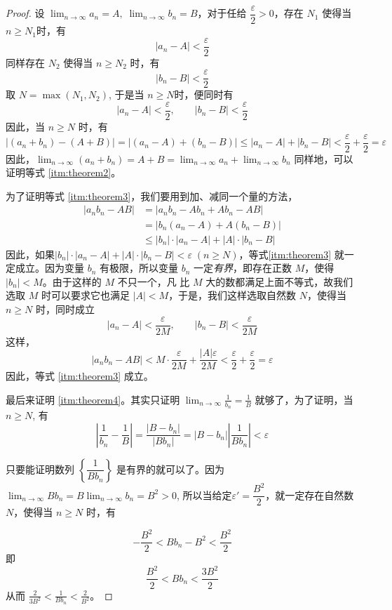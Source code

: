 \begin{proof}
    设 $\displaystyle \lim_{n\to\infty}a_n=A,\; \lim_{n\to\infty}b_n=B$，对于任给 $\dfrac{\varepsilon}{2}>0$，存在 $N_1$ 使得当 $n\geqslant N_1$时，有
\[|a_n-A|<\frac{\varepsilon}{2}\]
    同样存在 $N_2$ 使得当 $n\geqslant N_2$ 时，有
    \[|b_n-B|<\frac{\varepsilon}{2}\]
    取 $N=\max(N_1,N_2)$, 于是当 $n\geqslant N$时，便同时有
\[|a_n-A|<\frac{\varepsilon}{2},\qquad |b_n-B|<\frac{\varepsilon}{2}\]
    因此，当 $n\geqslant N$ 时，有
\[|(a_n+b_n)-(A+B)|=|(a_n-A)+(b_n-B)|\le |a_n-A|+|b_n-B|<\frac{\varepsilon}{2}+\frac{\varepsilon}{2}=\varepsilon\]
因此，$\displaystyle\lim_{n\to\infty}(a_n+b_n)=A+B=\lim_{n\to\infty}a_n+\lim_{n\to\infty}b_n$
同样地，可以证明等式 \ref{itm:theorem2}。

\medskip
为了证明等式 \ref{itm:theorem3}，我们要用到加、减同一个量的方法，
\[\begin{split}
    |a_nb_n - AB| &= |a_nb_n - Ab_n + Ab_n -AB|\\
&=|b_n(a_n-A)+A(b_n-B)|\\
&\le |b_n|\cdot |a_n-A|+|A|\cdot |b_n-B|
\end{split}\]
因此，如果$|b_n|\cdot |a_n-A|+|A|\cdot |b_n-B|<\varepsilon\; (n\ge N)$，等式\ref{itm:theorem3} 就一定成立。因为变量 $b_n$ 有极限，所以变量 $b_n$ 一定\emph{有界}，即存在正数 $M$，使得 $|b_n|<M$。由于这样的 $M$ 不只一个，凡
比 $M$ 大的数都满足上面不等式，故我们选取 $M$ 时可以要求它也满足 $|A|<M$，于是，我们这样选取自然数 $N$，使得当 $n\geqslant N$ 时，同时成立
\[|a_n-A|<\frac{\varepsilon}{2M},\qquad |b_n-B|<\frac{\varepsilon}{2M}\]
这样，
\[|a_nb_n-AB|<M\cdot \frac{\varepsilon}{2M}+\frac{|A|\varepsilon}{2M}<\frac{\varepsilon}{2}+\frac{\varepsilon}{2}=\varepsilon\]
因此，等式 \ref{itm:theorem3} 成立。

最后来证明 \ref{itm:theorem4}。其实只证明 $\displaystyle\lim_{n\to\infty}\frac{1}{b_n}=\frac{1}{B}$
就够了，为了证明，当 $n\geqslant N$, 有
\[\left|\frac{1}{b_n}-\frac{1}{B}\right|=\frac{|B-b_n|}{|Bb_n|}=|B-b_n|\left|\frac{1}{Bb_n}\right|<\varepsilon\]
{\linespread{1.65}\selectfont 只要能证明数列 $\left\{\dfrac{1}{Bb_n}\right\}$ 是有界的就可以了。因为 $\displaystyle\lim_{n\to\infty}Bb_n=B\lim_{n\to\infty}b_n=B^2>0$, 所以当给定$\varepsilon'=\dfrac{B^2}{2}$，就一定存在自然数 $N$，使得当 $n\geqslant N$ 时，有\par}
\[-\frac{B^2}{2}<Bb_n-B^2<\frac{B^2}{2}\]
即
\[\frac{B^2}{2}<Bb_n<\frac{3B^2}{2}\]
从而 $\displaystyle\frac{2}{3B^2}<\frac{1}{Bb_n}<\frac{2}{B^2}$。


\end{proof}
